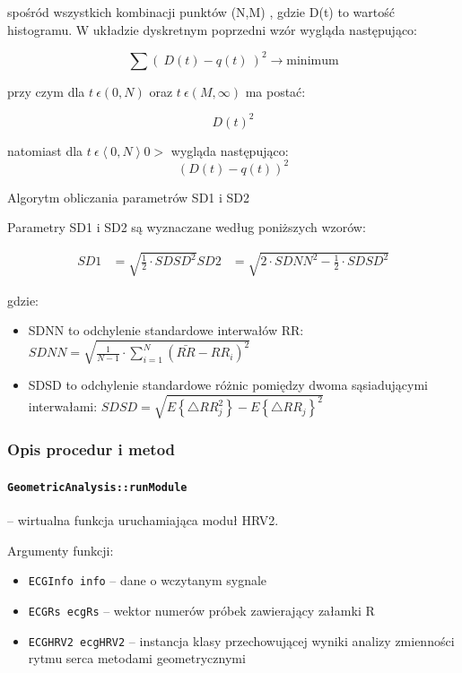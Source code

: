 \documentclass[a4paper, 11pt]{article}
\begin{document}
spośród wszystkich kombinacji punktów (N,M) , gdzie D(t) to wartość
histogramu. W układzie dyskretnym poprzedni wzór wygląda następująco:

\begin{equation}
\sum(\: D(t)-q(t)\:)^{2}\rightarrow \text{minimum}
\end{equation}


przy czym dla $t\:\epsilon(0,N)$ oraz $t\:\epsilon(M,\infty)$ ma
postać: 

\begin{equation}
D(t)^{2}
\end{equation}


natomiast dla $t\:\epsilon\left\langle 0,N\right\rangle 0>$ wygląda
następująco: 
\begin{equation}
(D(t)-q(t))^{2}
\end{equation}

Algorytm obliczania parametrów SD1 i SD2

Parametry SD1 i SD2 są wyznaczane według poniższych wzorów:

\begin{eqnarray}
SD1 &= \sqrt{\frac{1}{2}\cdot SDSD^{2}}
SD2 &= \sqrt{2\cdot SDNN^{2}-\frac{1}{2}\cdot SDSD^{2}}
\end{eqnarray}


gdzie:
\begin{itemize}
\item SDNN to odchylenie standardowe interwałów RR: $SDNN=\sqrt{\frac{1}{N-1}\cdot\sum_{i=1}^{N}\left(\bar{RR}-RR_{i}\right)^{2}}$
\item SDSD to odchylenie standardowe różnic pomiędzy dwoma sąsiadującymi
interwałami: $SDSD=\sqrt{E\left\{ \triangle RR_{j}^{2}\right\} -E\left\{ \triangle RR_{j}\right\} ^{2}}$
\end{itemize}

\subsubsection{Opis procedur i metod }
\label{sec:hrv2:procs}

\paragraph{\texttt{GeometricAnalysis::runModule}} -- wirtualna funkcja uruchamiająca moduł HRV2.

\medskip{}


Argumenty funkcji:
\begin{itemize}
\item \verb+ECGInfo info+ -- dane o wczytanym sygnale
\item \verb+ECGRs ecgRs+ -- wektor numerów próbek zawierający załamki R
\item \verb+ECGHRV2 ecgHRV2+ -- instancja klasy przechowującej wyniki analizy zmienności
rytmu serca metodami geometrycznymi
\end{itemize}
\medskip{}
\end{document}
